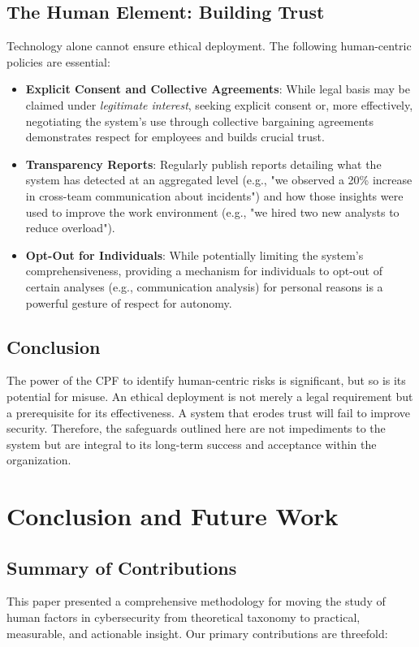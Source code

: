 \documentclass[11pt, a4paper]{article}
\begin{document}
\subsection{The Human Element: Building Trust}
Technology alone cannot ensure ethical deployment. The following human-centric policies are essential:
\begin{itemize}
    \item \textbf{Explicit Consent and Collective Agreements}: While legal basis may be claimed under \textit{legitimate interest}, seeking explicit consent or, more effectively, negotiating the system's use through collective bargaining agreements demonstrates respect for employees and builds crucial trust.
    \item \textbf{Transparency Reports}: Regularly publish reports detailing what the system has detected at an aggregated level (e.g., "we observed a 20\% increase in cross-team communication about incidents") and how those insights were used to improve the work environment (e.g., "we hired two new analysts to reduce overload").
    \item \textbf{Opt-Out for Individuals}: While potentially limiting the system's comprehensiveness, providing a mechanism for individuals to opt-out of certain analyses (e.g., communication analysis) for personal reasons is a powerful gesture of respect for autonomy.
\end{itemize}

\subsection{Conclusion}
The power of the CPF to identify human-centric risks is significant, but so is its potential for misuse. An ethical deployment is not merely a legal requirement but a prerequisite for its effectiveness. A system that erodes trust will fail to improve security. Therefore, the safeguards outlined here are not impediments to the system but are integral to its long-term success and acceptance within the organization.

\section{Conclusion and Future Work}
\label{sec:conclusion}

\subsection{Summary of Contributions}
This paper presented a comprehensive methodology for moving the study of human factors in cybersecurity from theoretical taxonomy to practical, measurable, and actionable insight. Our primary contributions are threefold:
\end{document}
